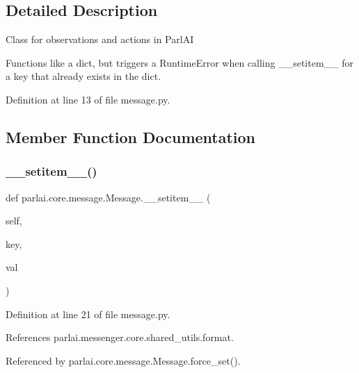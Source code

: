 \subsection{Detailed Description}
\begin{DoxyVerb}Class for observations and actions in ParlAI

Functions like a dict, but triggers a RuntimeError when calling __setitem__
for a key that already exists in the dict.
\end{DoxyVerb}
 

Definition at line 13 of file message.\+py.



\subsection{Member Function Documentation}
\mbox{\label{classparlai_1_1core_1_1message_1_1Message_a2fd83603b06a7da7ab7fc99649d855f6}} 
\subsubsection{\texorpdfstring{\+\_\+\+\_\+setitem\+\_\+\+\_\+()}{\_\_setitem\_\_()}}
{\footnotesize\ttfamily def parlai.\+core.\+message.\+Message.\+\_\+\+\_\+setitem\+\_\+\+\_\+ (\begin{DoxyParamCaption}\item[{}]{self,  }\item[{}]{key,  }\item[{}]{val }\end{DoxyParamCaption})}



Definition at line 21 of file message.\+py.



References parlai.\+messenger.\+core.\+shared\+\_\+utils.\+format.



Referenced by parlai.\+core.\+message.\+Message.\+force\+\_\+set().

